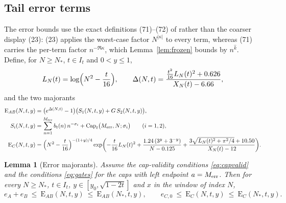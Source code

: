\documentclass[11pt]{article}
\newtheorem{lemma}[theorem]{Lemma}
\theoremstyle{definition}
\newcommand{\CapT}{\operatorname{Cap}}
\begin{document}
\subsection{Tail error terms}\label{sec:tailerrors}

The error bounds use the exact definitions (71)--(72) of
\cite{Polymath} rather than the coarser display (23): (23) applies
the worst-case factor $N^{|\kappa|}$ to every term, whereas (71)
carries the per-term factor $n^{-\Re\kappa}$, which
Lemma~\ref{lem:frozen} bounds by $n^{\widehat k}$. Define, for
$N\ge N_*$, $t\in I_t$ and $0<y\le1$,
\[
L_N(t)=\log\Bigl(N^2-\frac t{16}\Bigr),
\qquad
\Delta(N,t)=\frac{\frac{t^2}{16}L_N(t)^2+0.626}{X_N(t)-6.66},
\]
and the two majorants
\begin{align*}
\mathrm{E}_{AB}(N,t,y)&=
\bigl(e^{\Delta(N,t)}-1\bigr)
\bigl(S_1(N,t,y)+G\,S_2(N,t,y)\bigr),
\\
S_i(N,t,y)&=\sum_{n=1}^{M_{\rm err}}b_t(n)\,n^{-\sigma_i}
+\CapT_t\bigl(M_{\rm err},N;\sigma_i\bigr)
\qquad(i=1,2),
\\
\mathrm{E}_{C}(N,t,y)&=
\Bigl(N^2-\frac t{16}\Bigr)^{-(1+y)/4}
\exp\biggl(
-\frac t{16}L_N(t)^2
+\frac{1.24\,(3^y+3^{-y})}{N-0.125}
+\frac{3\sqrt{L_N(t)^2+\pi^2/4}+10.50}{X_N(t)-12}
\biggr).
\end{align*}

\begin{lemma}[Error majorants]\label{lem:errmaj}
Assume the cap-validity conditions \eqref{eq:capvalid} and the
conditions \eqref{eq:gates} for the caps with left endpoint
$a=M_{\rm err}$. Then for every $N\ge N_*$, $t\in I_t$,
$y\in[y_0,\sqrt{1-2t}]$ and $x$ in the window of index $N$,
\[
e_A+e_B\ \le\ \mathrm{E}_{AB}(N,t,y)\ \le\ \mathrm{E}_{AB}(N_*,t,y),
\qquad
e_{C,0}\ \le\ \mathrm{E}_{C}(N,t,y)\ \le\ \mathrm{E}_{C}(N_*,t,y).
\]
\end{lemma}
\end{document}
